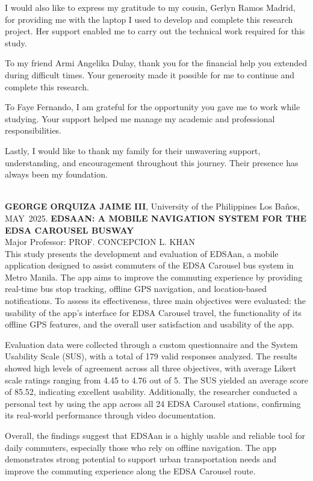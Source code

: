 \documentclass{icsthesis}
\renewcommand{\TITLE}{EDSAAN: A MOBILE NAVIGATION SYSTEM FOR THE EDSA CAROUSEL BUSWAY}
\renewcommand{\AUTHOR}{GEORGE ORQUIZA JAIME III}
\renewcommand{\MONTH}{MAY}
\renewcommand{\YEAR}{2025}
\begin{document}
\begin{frontmatter}
\begin{acknowledgement}
I would also like to express my gratitude to my cousin, Gerlyn Ramos Madrid, for providing me with the laptop I used to develop and complete this research project. Her support enabled me to carry out the technical work required for this study.

To my friend Armi Angelika Dulay, thank you for the financial help you extended during difficult times. Your generosity made it possible for me to continue and complete this research. 

To Faye Fernando, I am grateful for the opportunity you gave me to work while studying. Your support helped me manage my academic and professional responsibilities.

Lastly, I would like to thank my family for their unwavering support, understanding, and encouragement throughout this journey. Their presence has always been my foundation.
		\end{acknowledgement}
		
		\maketableofcontents
		
		\makelistoftables

		\makelistoffigures
	
		
		\begin{abstractwithpageno}	
		\\
		\textbf{\AUTHOR}, University of the Philippines Los Ba\~{n}os, \MONTH\ \YEAR. \textbf{\TITLE}
		\\Major Professor: PROF. CONCEPCION L. KHAN\\

This study presents the development and evaluation of EDSAan, a mobile application designed to assist commuters of the EDSA Carousel bus system in Metro Manila. The app aims to improve the commuting experience by providing real-time bus stop tracking, offline GPS navigation, and location-based notifications. To assess its effectiveness, three main objectives were evaluated: the usability of the app’s interface for EDSA Carousel travel, the functionality of its offline GPS features, and the overall user satisfaction and usability of the app.

Evaluation data were collected through a custom questionnaire and the System Usability Scale (SUS), with a total of 179 valid responses analyzed. The results showed high levels of agreement across all three objectives, with average Likert scale ratings ranging from 4.45 to 4.76 out of 5. The SUS yielded an average score of 85.52, indicating excellent usability. Additionally, the researcher conducted a personal test by using the app across all 24 EDSA Carousel stations, confirming its real-world performance through video documentation.

Overall, the findings suggest that EDSAan is a highly usable and reliable tool for daily commuters, especially those who rely on offline navigation. The app demonstrates strong potential to support urban transportation needs and improve the commuting experience along the EDSA Carousel route.
		\end{abstractwithpageno}

	\end{frontmatter}
	
\end{document}
